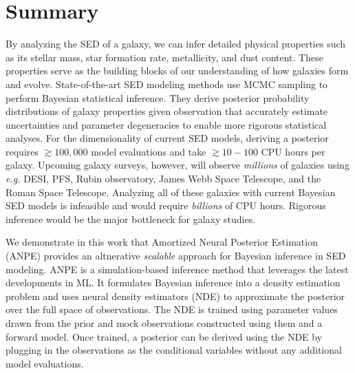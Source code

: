 \section{Summary} \label{sec:summary}
By analyzing the SED of a galaxy, we can infer detailed physical properties
such as its stellar mass, star formation rate, metallicity, and dust content. 
These properties serve as the building blocks of our understanding of how
galaxies form and evolve. 
State-of-the-art SED modeling methods use MCMC sampling to perform Bayesian
statistical inference. 
They derive posterior probability distributions of galaxy properties given
observation that accurately estimate uncertainties and parameter degeneracies
to enable more rigorous statistical analyses. 
For the dimensionality of current SED models, deriving a posterior requires 
${\gtrsim}100,000$ model evaluations and take ${\gtrsim}10-100$ CPU hours per 
galaxy. 
Upcoming galaxy surveys, however, will observe \emph{millions} of galaxies
using \emph{e.g.} DESI, PFS, Rubin observatory, James Webb Space Telescope, and
the Roman Space Telescope. 
Analyzing all of these galaxies with current Bayesian SED models is infeasible
and would require \emph{billions} of CPU hours. 
Rigorous inference would be the major bottleneck for galaxy studies. 

We demonstrate in this work that Amortized Neural Posterior Estimation (ANPE)
provides an altnerative \emph{scalable} approach for Bayesian inference in SED
modeling. 
ANPE is a simulation-based inference method that leverages the latest
developments in ML.
It formulates Bayesian inference into a density estimation problem and uses 
neural density estimators (NDE) to approximate the posterior over the full
space of observations. 
The NDE is trained using parameter values drawn from the prior and mock
observations constructed using them and a forward model.  
Once trained, a posterior can be derived using the NDE by plugging in the observations as the conditional variables without any additional model evaluations. 

